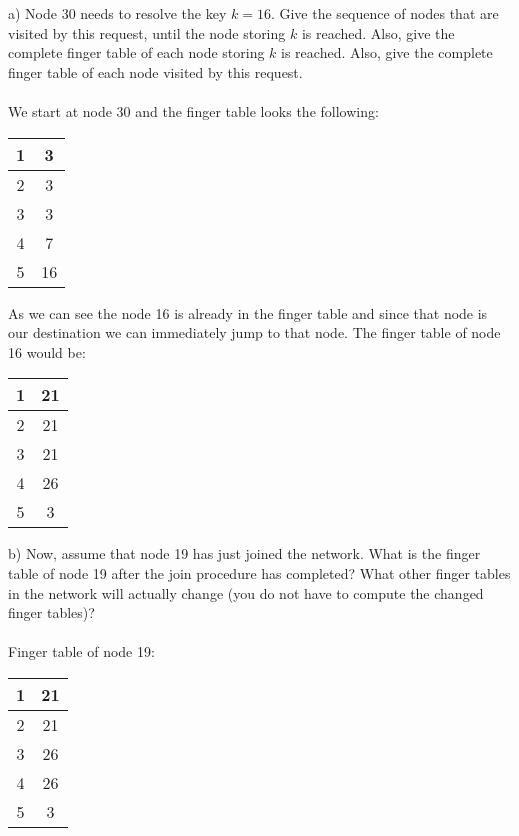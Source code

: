 \documentclass{article}
\begin{document}
a) Node 30 needs to resolve the key $k = 16$. Give the sequence of nodes that are visited by this request,
until the node storing $k$ is reached. Also, give the complete finger table of each node storing $k$ is
reached. Also, give the complete finger table of each node visited by this request.\\
\\
We start at node 30 and the finger table looks the following:
\begin{center}
    \begin{tabular}{ |c|c| } 
        \hline
        1 & 3\\ 
        \hline
        2 & 3\\ 
        \hline
        3 & 3\\ 
        \hline
        4 & 7\\ 
        \hline
        5 & 16\\ 
        \hline
    \end{tabular}
\end{center}
As we can see the node 16 is already in the finger table and since that node is our destination we can
immediately jump to that node. The finger table of node 16 would be:
\begin{center}
    \begin{tabular}{ |c|c| } 
        \hline
        1 & 21\\ 
        \hline
        2 & 21\\ 
        \hline
        3 & 21\\ 
        \hline
        4 & 26\\ 
        \hline
        5 & 3\\ 
        \hline
    \end{tabular}
\end{center}
b) Now, assume that node 19 has just joined the network. What is the finger table of node 19 after the
join procedure has completed? What other finger tables in the network will actually change (you do not
have to compute the changed finger tables)?\\
\\
Finger table of node 19:
\begin{center}
    \begin{tabular}{ |c|c| } 
        \hline
        1 & 21\\ 
        \hline
        2 & 21\\ 
        \hline
        3 & 26\\ 
        \hline
        4 & 26\\ 
        \hline
        5 & 3\\ 
        \hline
    \end{tabular}
\end{center}
\end{document}
